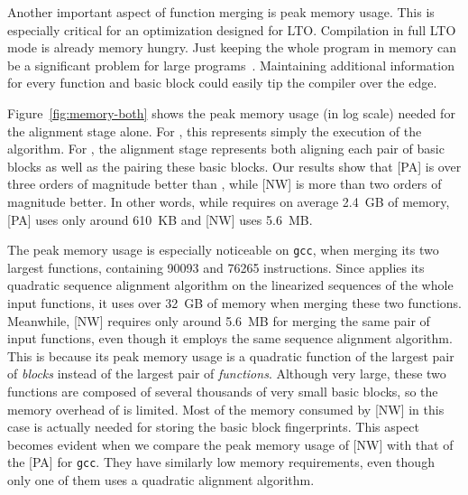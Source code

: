 
Another important aspect of function merging is peak memory usage. This is especially critical for an optimization designed for LTO.
Compilation in full LTO mode is already memory hungry. Just keeping the whole program in memory can be a significant problem for large programs~\cite{johnson17}. Maintaining additional information for every function and basic block could easily tip the compiler over the edge.

Figure~\ref{fig:memory-both} shows the peak memory usage (in log scale) needed for the alignment stage alone.
For {\SOAName}, this represents simply the execution of the {\NW} algorithm.
For {\ProjName}, the alignment stage represents both aligning each pair of basic blocks as well as the pairing these basic blocks.
Our results show that {[PA]} is over three orders of magnitude better than {\SOAName}, while {[NW]} is more than two orders of magnitude better.
In other words, while {\SOAName} requires on average 2.4~GB of memory, {[PA]} uses only around 610~KB and {[NW]} uses 5.6~MB.

The peak memory usage is especially noticeable on \texttt{gcc}, when merging its two largest functions, containing 90093 and 76265 instructions.
Since {\SOAName} applies its quadratic sequence alignment algorithm on the linearized sequences of the whole input functions, it uses over 32~GB of memory when merging these two functions.
Meanwhile, {[NW]} requires only around 5.6~MB for merging the same pair of input functions, even though it employs the same sequence alignment algorithm. This is because its peak memory usage is a quadratic function of the largest pair of \emph{blocks} instead of the largest pair of \emph{functions}.
Although very large, these two functions are composed of several thousands of very small basic blocks, so the memory overhead of {\NW} is limited.
Most of the memory consumed by {[NW]} in this case is actually needed for storing the basic block fingerprints.
This aspect becomes evident when we compare the peak memory usage of {[NW]} with that of the {[PA]} for \texttt{gcc}. They have similarly low memory requirements, even though only one of them uses a quadratic alignment algorithm.


